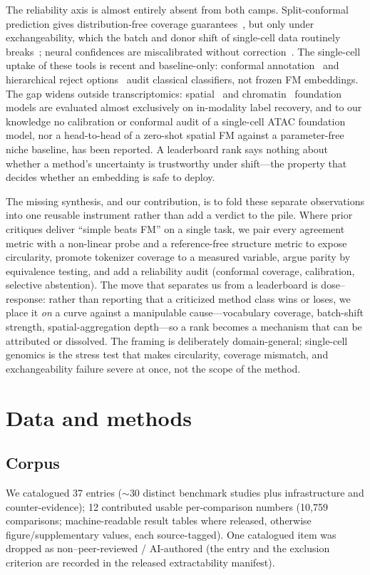 \documentclass[fleqn,10pt,lineno]{wlpeerj}  %
\begin{document}
The reliability axis is almost entirely absent from both camps. Split-conformal prediction gives distribution-free coverage guarantees~\cite{vovk2005,angelopoulos2023}, but only under exchangeability, which the batch and donor shift of single-cell data routinely breaks~\cite{barber2023}; neural confidences are miscalibrated without correction~\cite{guo2017}. The single-cell uptake of these tools is recent and baseline-only: conformal annotation~\cite{lopezdecastro2025} and hierarchical reject options~\cite{theunissen2024} audit classical classifiers, not frozen FM embeddings. The gap widens outside transcriptomics: spatial~\cite{nicheformer2025} and chromatin~\cite{chromfound2025,atacformer2024,epifoundation2025} foundation models are evaluated almost exclusively on in-modality label recovery, and to our knowledge no calibration or conformal audit of a single-cell ATAC foundation model, nor a head-to-head of a zero-shot spatial FM against a parameter-free niche baseline, has been reported. A leaderboard rank says nothing about whether a method's uncertainty is trustworthy under shift---the property that decides whether an embedding is safe to deploy.

The missing synthesis, and our contribution, is to fold these separate observations into one reusable instrument rather than add a verdict to the pile. Where prior critiques deliver ``simple beats FM'' on a single task, we pair every agreement metric with a non-linear probe and a reference-free structure metric to expose circularity, promote tokenizer coverage to a measured variable, argue parity by equivalence testing, and add a reliability audit (conformal coverage, calibration, selective abstention). The move that separates us from a leaderboard is dose--response: rather than reporting that a criticized method class wins or loses, we place it \emph{on} a curve against a manipulable cause---vocabulary coverage, batch-shift strength, spatial-aggregation depth---so a rank becomes a mechanism that can be attributed or dissolved. The framing is deliberately domain-general; single-cell genomics is the stress test that makes circularity, coverage mismatch, and exchangeability failure severe at once, not the scope of the method.

\section{Data and methods}
\subsection{Corpus}
We catalogued 37 entries ($\sim$30 distinct benchmark studies plus infrastructure and counter-evidence); 12 contributed usable per-comparison numbers (10{,}759 comparisons; machine-readable result tables where released, otherwise figure/supplementary values, each source-tagged). One catalogued item was dropped as non--peer-reviewed / AI-authored (the entry and the exclusion criterion are recorded in the released extractability manifest).
\end{document}
